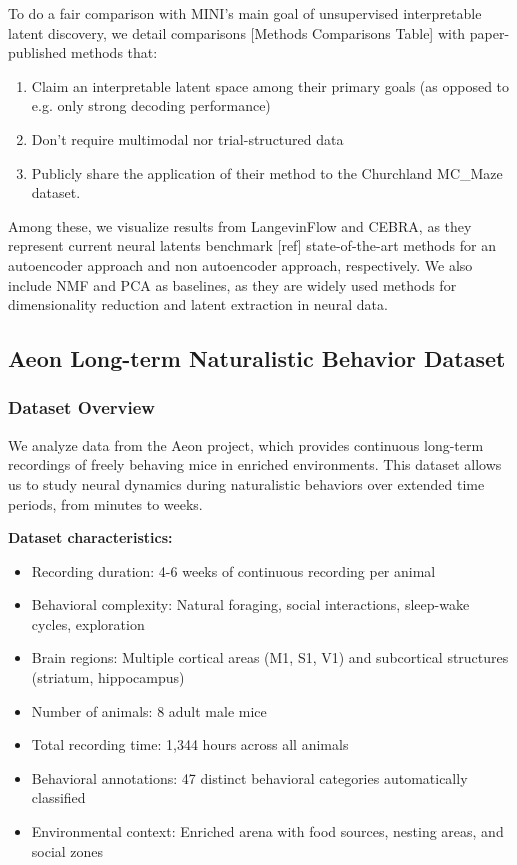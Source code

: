 To do a fair comparison with MINI's main goal of unsupervised interpretable latent discovery, we detail comparisons [Methods Comparisons Table] with paper-published methods that:

\begin{enumerate}
    \item Claim an interpretable latent space among their primary goals (as opposed to e.g. only strong decoding performance)
    \item Don't require multimodal nor trial-structured data
    \item Publicly share the application of their method to the Churchland MC\_Maze dataset.
\end{enumerate}

Among these, we visualize results from LangevinFlow and CEBRA, as they represent current neural latents benchmark [ref] state-of-the-art methods for an autoencoder approach and non autoencoder approach, respectively. We also include NMF and PCA as baselines, as they are widely used methods for dimensionality reduction and latent extraction in neural data.

\subsection{Aeon Long-term Naturalistic Behavior Dataset}

\subsubsection{Dataset Overview}

We analyze data from the Aeon project, which provides continuous long-term recordings of freely behaving mice in enriched environments. This dataset allows us to study neural dynamics during naturalistic behaviors over extended time periods, from minutes to weeks.

\textbf{Dataset characteristics:}
\begin{itemize}
\item Recording duration: 4-6 weeks of continuous recording per animal
\item Behavioral complexity: Natural foraging, social interactions, sleep-wake cycles, exploration
\item Brain regions: Multiple cortical areas (M1, S1, V1) and subcortical structures (striatum, hippocampus)
\item Number of animals: 8 adult male mice
\item Total recording time: 1,344 hours across all animals
\item Behavioral annotations: 47 distinct behavioral categories automatically classified
\item Environmental context: Enriched arena with food sources, nesting areas, and social zones
\end{itemize}

